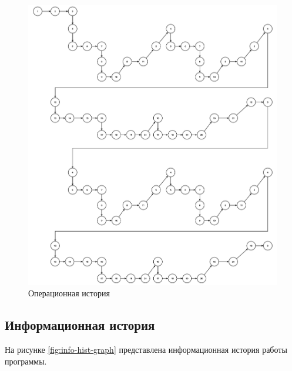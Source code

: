 \begin{figure}[H]
    \centering
    \includegraphics[width=1.0\textwidth, pages=-]{images/op_history.pdf}
    \caption{Операционная история}
    \label{fig:op-hist-graph}
\end{figure}

\subsection{Информационная история}

На рисунке \ref{fig:info-hist-graph} представлена информационная история работы программы.

